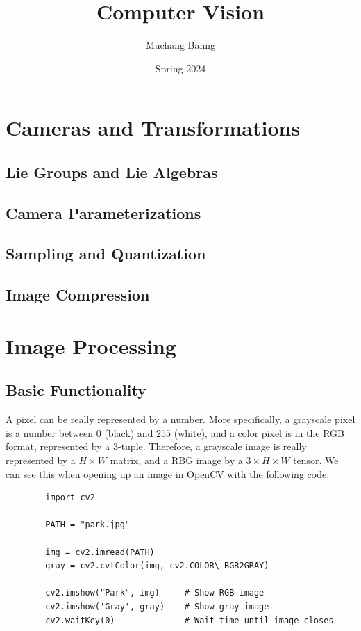 \documentclass{article}
\begin{document}
\title{Computer Vision}
\author{Muchang Bahng}
\date{Spring 2024}

\maketitle
\tableofcontents
\pagebreak

\section{Cameras and Transformations}

  \subsection{Lie Groups and Lie Algebras}

  \subsection{Camera Parameterizations}

  \subsection{Sampling and Quantization}

  \subsection{Image Compression}

\section{Image Processing}

  \subsection{Basic Functionality}

      A pixel can be really represented by a number. More specifically, a grayscale pixel is a number between $0$ (black) and $255$ (white), and a color pixel is in the RGB format, represented by a $3$-tuple. Therefore, a grayscale image is really represented by a $H \times W$ matrix, and a RBG image by a $3 \times H \times W$ tensor. We can see this when opening up an image in OpenCV with the following code: 
      \begin{lstlisting}
        import cv2 

        PATH = "park.jpg"

        img = cv2.imread(PATH)
        gray = cv2.cvtColor(img, cv2.COLOR\_BGR2GRAY) 

        cv2.imshow("Park", img)     # Show RGB image
        cv2.imshow('Gray', gray)    # Show gray image
        cv2.waitKey(0)              # Wait time until image closes
      \end{lstlisting}
\end{document}
